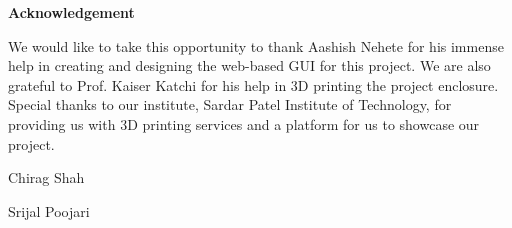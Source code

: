 \newpage
\thispagestyle{empty}
\vspace*{3in}
\centering
\begin{normalsize}
\textbf{Acknowledgement}
\vspace{2cm}
\end{normalsize}

\par We would like to take this opportunity to thank Aashish Nehete for his immense help in creating and designing the web-based GUI for this project. We are also grateful to Prof. Kaiser Katchi for his help in 3D printing the project enclosure.
Special thanks to our institute, Sardar Patel Institute of Technology, for providing us with 3D printing services and a platform for us to showcase our project.

\vspace{2cm}

\hspace*{4in}  Chirag Shah

\hspace*{4in}  Srijal Poojari
